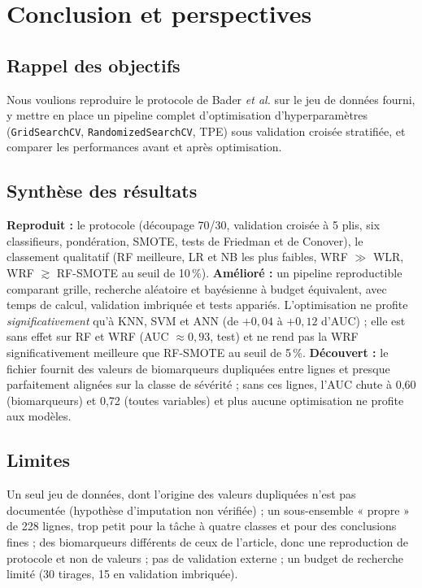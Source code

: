 \section{Conclusion et perspectives}

\subsection{Rappel des objectifs}
Nous voulions reproduire le protocole de Bader \emph{et al.} \cite{bader2024} sur le jeu de données fourni, y mettre en place un pipeline complet d'optimisation d'hyperparamètres (\texttt{GridSearchCV}, \texttt{RandomizedSearchCV}, TPE) sous validation croisée stratifiée, et comparer les performances avant et après optimisation.

\subsection{Synthèse des résultats}
\textbf{Reproduit :} le protocole (découpage 70/30, validation croisée à 5 plis, six classifieurs, pondération, SMOTE, tests de Friedman et de Conover), le classement qualitatif (RF meilleure, LR et NB les plus faibles, WRF $\gg$ WLR, WRF $\gtrsim$ RF-SMOTE au seuil de 10\,\%). \textbf{Amélioré :} un pipeline reproductible comparant grille, recherche aléatoire et bayésienne à budget équivalent, avec temps de calcul, validation imbriquée et tests appariés. L'optimisation ne profite \emph{significativement} qu'à KNN, SVM et ANN (de $+0{,}04$ à $+0{,}12$ d'AUC) ; elle est sans effet sur RF et WRF (AUC $\approx 0{,}93$, test) et ne rend pas la WRF significativement meilleure que RF-SMOTE au seuil de 5\,\%. \textbf{Découvert :} le fichier fournit des valeurs de biomarqueurs dupliquées entre lignes et presque parfaitement alignées sur la classe de sévérité ; sans ces lignes, l'AUC chute à 0,60 (biomarqueurs) et 0,72 (toutes variables) et plus aucune optimisation ne profite aux modèles.

\subsection{Limites}
Un seul jeu de données, dont l'origine des valeurs dupliquées n'est pas documentée (hypothèse d'imputation non vérifiée) ; un sous-ensemble « propre » de 228 lignes, trop petit pour la tâche à quatre classes et pour des conclusions fines ; des biomarqueurs différents de ceux de l'article, donc une reproduction de protocole et non de valeurs ; pas de validation externe ; un budget de recherche limité (30 tirages, 15 en validation imbriquée).

